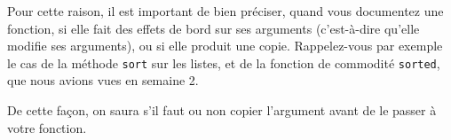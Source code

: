     Pour cette raison, il est important de bien préciser, quand vous
documentez une fonction, si elle fait des effets de bord sur ses
arguments (c'est-à-dire qu'elle modifie ses arguments), ou si elle
produit une copie. Rappelez-vous par exemple le cas de la méthode
\texttt{sort} sur les listes, et de la fonction de commodité
\texttt{sorted}, que nous avions vues en semaine 2.

De cette façon, on saura s'il faut ou non copier l'argument avant de le
passer à votre fonction.


    
    
    
